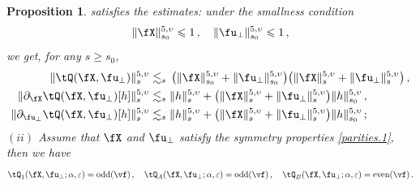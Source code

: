 \documentclass[a4paper,reqno,10pt]{article}
\newtheorem{pro}{Proposition}[section]
\newcommand{\pa}{\partial}
\begin{document}
\begin{pro}
 	satisfies the estimates: under the smallness condition
    $$
    \| \fX\|_{s_0}^{5,\upsilon} \leqslant 1\,,\quad  \| \fu_{\perp}\|_{s_0}^{5,\upsilon} \leqslant1 \,,
    $$ 
    we get, for any $s\geq s_0$,
 	\begin{align}
 		\| \tQ(\fX,\fu_{\perp}) \|_{s}^{5,\upsilon}& \lesssim_{s} \,\big( \| \fX\|_{s_0}^{5,\upsilon} + \| \fu_{\perp}\|_{s_0}^{5,\upsilon}   \big)\big( \| \fX\|_{s}^{5,\upsilon} + \| \fu_{\perp}\|_{s}^{5,\upsilon}   \big)\,, \label{quad.est.Q} \\
 			\| \pa_{\fX}\tQ(\fX,\fu_{\perp})[h] \|_{s}^{5,\upsilon}  &\lesssim_{s} \| h \|_{s}^{5,\upsilon}+\big( \| \fX\|_{s}^{5,\upsilon} + \| \fu_{\perp}\|_{s}^{5,\upsilon} \big)\| h \|_{s_0}^{5,\upsilon} \,,  \label{dX.est.Q}  \\
 				\| \pa_{\fu_{\perp}}\tQ(\fX,\fu_{\perp})[h] \|_{s}^{5,\upsilon} &\lesssim_{s} \| h \|_{s}^{5,\upsilon} +  \big( \| \fX\|_{s}^{5,\upsilon} + \| \fu_{\perp}\|_{s}^{5,\upsilon} \big)\| h \|_{s_0}^{5,\upsilon} \,;  \label{du.est.Q} 
 	\end{align}
 	\noindent $(ii)$ Assume that  $\fX$ and  $\fu_{\perp}$ satisfy the symmetry properties \eqref{parities.1}, then we have
 	\begin{equation}
 		\begin{aligned}
 			\tQ_{1}(\fX,\fu_{\perp};\alpha,\varepsilon)= {\rm odd}(\vf) \,, \quad	\tQ_{A}(\fX,\fu_{\perp};\alpha,\varepsilon)= {\rm odd}(\vf)\,, \quad		\tQ_{B}(\fX,\fu_{\perp};\alpha,\varepsilon)=  {\rm even}(\vf) \,.
 		\end{aligned}
 	\end{equation}
 \end{pro}
\end{document}
